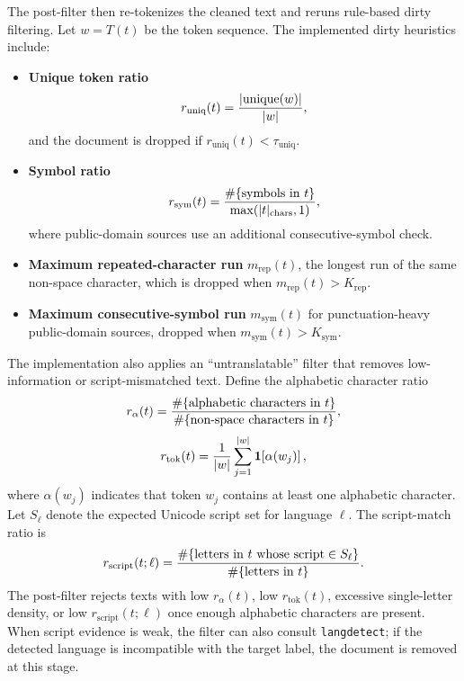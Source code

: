 \documentclass{article}
\newcommand{\ind}[1]{\mathbf{1}\!\left[#1\right]}
\begin{document}
{\color{red}The post-filter then re-tokenizes the cleaned text and reruns rule-based dirty filtering. Let $w=T(t)$ be the token sequence. The implemented dirty heuristics include:}
\begin{itemize}
  \item {\color{red}\textbf{Unique token ratio}}
  \[
  {\color{red}
  r_{\text{uniq}}(t)=\frac{|\mathrm{unique}(w)|}{|w|},
  }
  \]
  {\color{red}and the document is dropped if $r_{\text{uniq}}(t)<\tau_{\text{uniq}}$.}

  \item {\color{red}\textbf{Symbol ratio}}
  \[
  {\color{red}
  r_{\text{sym}}(t)=\frac{\#\{\text{symbols in } t\}}{\max(|t|_{\text{chars}},1)},
  }
  \]
  {\color{red}where public-domain sources use an additional consecutive-symbol check.}

  \item {\color{red}\textbf{Maximum repeated-character run}} {\color{red}$m_{\text{rep}}(t)$, the longest run of the same non-space character, which is dropped when $m_{\text{rep}}(t)>K_{\text{rep}}$.}

  \item {\color{red}\textbf{Maximum consecutive-symbol run}} {\color{red}$m_{\text{sym}}(t)$ for punctuation-heavy public-domain sources, dropped when $m_{\text{sym}}(t)>K_{\text{sym}}$.}
\end{itemize}

{\color{red}The implementation also applies an ``untranslatable'' filter that removes low-information or script-mismatched text. Define the alphabetic character ratio}
\[
{\color{red}
r_{\alpha}(t)=\frac{\#\{\text{alphabetic characters in } t\}}{\#\{\text{non-space characters in } t\}},
}
\]
\[
{\color{red}
r_{\text{tok}}(t)=\frac{1}{|w|}\sum_{j=1}^{|w|}\ind{\alpha(w_j)},
}
\]
{\color{red}where $\alpha(w_j)$ indicates that token $w_j$ contains at least one alphabetic character. Let $S_{\ell}$ denote the expected Unicode script set for language $\ell$. The script-match ratio is}
\[
{\color{red}
r_{\text{script}}(t;\ell)=
\frac{\#\{\text{letters in } t \text{ whose script}\in S_{\ell}\}}
{\#\{\text{letters in } t\}}.
}
\]
{\color{red}The post-filter rejects texts with low $r_{\alpha}(t)$, low $r_{\text{tok}}(t)$, excessive single-letter density, or low $r_{\text{script}}(t;\ell)$ once enough alphabetic characters are present. When script evidence is weak, the filter can also consult \texttt{langdetect}; if the detected language is incompatible with the target label, the document is removed at this stage.}
\end{document}
